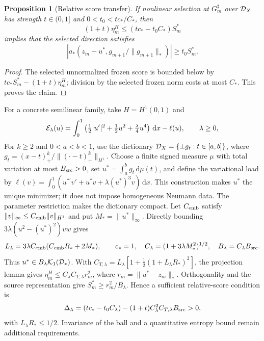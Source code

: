 \documentclass[11pt]{article}
\newtheorem{proposition}[theorem]{Proposition}
\theoremstyle{remark}\newtheorem{remark}[theorem]{Remark}
\begin{document}
\begin{proposition}[Relative score transfer]
\label{prop:c5-transfer}
If nonlinear selection at $G_m^\sharp$ over $\mathcal D_X$ has strength
$t\in(0,1]$ and $0<t_0<tc_*/C_*$, then
\begin{equation}
 (1+t)\eta_m^H\le (tc_*-t_0C_*)S_m^*
 \label{eq:c5-relative}
\end{equation}
implies that the selected direction satisfies
\[
 \left|a_*(z_m-u^*,g_{m+1}/\|g_{m+1}\|_*)\right|\ge t_0S_m^*.
\]
\end{proposition}
\begin{proof}
The selected unnormalized frozen score is bounded below by
$t c_*S_m^*-(1+t)\eta_m^H$; division by the selected frozen norm costs at most
$C_*$.  This proves the claim.
\end{proof}

For a concrete semilinear family, take $H=H^1(0,1)$ and
\[
 \mathcal E_\lambda(u)=\int_0^1\left(\tfrac12|u'|^2+\tfrac12u^2+\tfrac\lambda4u^4\right)\,\mathrm d x-\ell(u),
 \qquad \lambda\ge0,
\]
For $k\ge2$ and $0<a<b<1$, use the dictionary
$\mathcal D_X=\{\pm g_t:t\in[a,b]\}$, where
$g_t=(x-t)_+^k/\|(\cdot-t)_+^k\|_{H^1}$.
Choose a finite signed measure $\mu$ with total variation at most $B_{\rm src}>0$,
set $u^*=\int_a^b g_t\,\mathrm d\mu(t)$, and define the variational load by
$\ell(v)=\int_0^1(u^{*\prime}v'+u^*v+\lambda(u^*)^3v)\,\mathrm dx$.
This construction makes $u^*$ the unique minimizer; it does not impose
homogeneous Neumann data. The parameter restriction makes the dictionary compact.
Let $C_{\rm emb}$ satisfy $\|v\|_\infty\le C_{\rm emb}\|v\|_{H^1}$
and put $M_*=\|u^*\|_\infty$. Directly bounding
$3\lambda(u^2-(u^*)^2)vw$ gives
\[
 L_\lambda=3\lambda C_{\rm emb}(C_{\rm emb}R_*+2M_*),\qquad
 c_*=1,\quad C_\lambda=(1+3\lambda M_*^2)^{1/2},\quad
 B_\lambda=C_\lambda B_{\rm src}.
\]
Thus $u^*\in B_\lambda\mathcal K_1(\mathcal D_*)$. With
$C_{T,\lambda}=L_\lambda[1+\tfrac12(1+L_\lambda R_*)^2]$,
the projection lemma gives $\eta_m^H\le C_\lambda C_{T,\lambda}r_m^2$,
where $r_m=\|u^*-z_m\|_*$. Orthogonality and the source representation give
$S_m^*\ge r_m^2/B_\lambda$. Hence a sufficient relative-score condition is
\begin{equation}
\Delta_\lambda=(tc_*-t_0C_\lambda)
 -(1+t)C_\lambda^2C_{T,\lambda}B_{\rm src}>0,
 \label{eq:c5-small-lambda-score}
\end{equation}
with $L_\lambda R_*\le1/2$. Invariance of the ball and a quantitative
entropy bound remain additional requirements.
\end{document}
